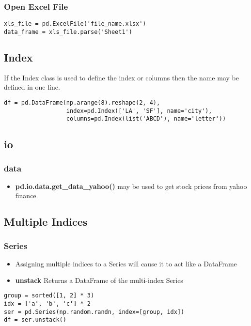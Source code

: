 %
\subsubsection{Open Excel File}
\begin{lstlisting}
xls_file = pd.ExcelFile('file_name.xlsx')
data_frame = xls_file.parse('Sheet1')
\end{lstlisting}

\subsection{Index}
If the Index class is used to define the index or columns then the name may be
defined in one line.
\begin{lstlisting}
df = pd.DataFrame(np.arange(8).reshape(2, 4),
                  index=pd.Index(['LA', 'SF'], name='city'),
                  columns=pd.Index(list('ABCD'), name='letter'))
\end{lstlisting}

\subsection{io}

%
\subsubsection{data}
  \begin{itemize}

    \item \textbf{pd.io.data.get\_data\_yahoo()} may be used to get stock prices
      from yahoo finance
  \end{itemize}

%
\subsection{Multiple Indices}

%
\subsubsection{Series}
\begin{itemize}
  \item Assigning multiple indices to a Series will cause it to act like a
    DataFrame

  \item \textbf{unstack} Returns a DataFrame of the multi-index Series
\end{itemize}
\begin{lstlisting}
group = sorted([1, 2] * 3)
idx = ['a', 'b', 'c'] * 2
ser = pd.Series(np.random.randn, index=[group, idx])
df = ser.unstack()
\end{lstlisting}

